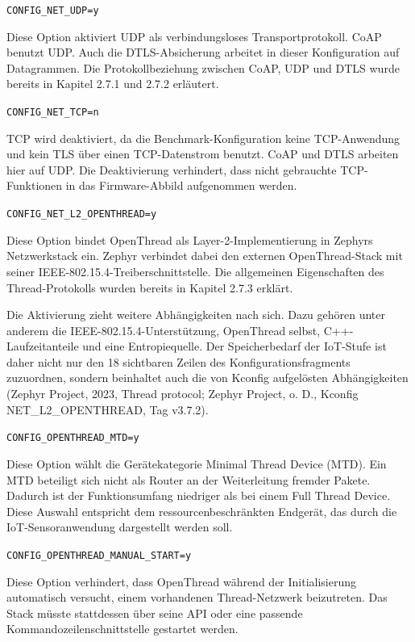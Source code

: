\lstinline[style=fileinline]|CONFIG_NET_UDP=y|

Diese Option aktiviert UDP als verbindungsloses Transportprotokoll. CoAP benutzt UDP. Auch die DTLS-Absicherung arbeitet in dieser Konfiguration auf Datagrammen. Die Protokollbeziehung zwischen CoAP, UDP und DTLS wurde bereits in Kapitel 2.7.1 und 2.7.2 erl{\"a}utert.

\lstinline[style=fileinline]|CONFIG_NET_TCP=n|

TCP wird deaktiviert, da die Benchmark-Konfiguration keine TCP-Anwendung und kein TLS {\"u}ber einen TCP-Datenstrom benutzt. CoAP und DTLS arbeiten hier auf UDP. Die Deaktivierung verhindert, dass nicht gebrauchte TCP-Funktionen in das Firmware-Abbild aufgenommen werden.

\lstinline[style=fileinline]|CONFIG_NET_L2_OPENTHREAD=y|

Diese Option bindet OpenThread als Layer-2-Implementierung in Zephyrs Netzwerkstack ein. Zephyr verbindet dabei den externen OpenThread-Stack mit seiner IEEE-802.15.4-Treiberschnittstelle. Die allgemeinen Eigenschaften des Thread-Protokolls wurden bereits in Kapitel 2.7.3 erkl{\"a}rt.

Die Aktivierung zieht weitere Abh{\"a}ngigkeiten nach sich. Dazu geh{\"o}ren unter anderem die IEEE-802.15.4-Unterst{\"u}tzung, OpenThread selbst, C++-Laufzeitanteile und eine Entropiequelle. Der Speicherbedarf der IoT-Stufe ist daher nicht nur den 18 sichtbaren Zeilen des Konfigurationsfragments zuzuordnen, sondern beinhaltet auch die von Kconfig aufgel{\"o}sten Abh{\"a}ngigkeiten (Zephyr Project, 2023, \glqq{}Thread protocol\grqq{}; Zephyr Project, o. D., Kconfig NET\_L2\_OPENTHREAD, Tag v3.7.2).

\lstinline[style=fileinline]|CONFIG_OPENTHREAD_MTD=y|

Diese Option w{\"a}hlt die Ger{\"a}tekategorie Minimal Thread Device (MTD). Ein MTD beteiligt sich nicht als Router an der Weiterleitung fremder Pakete. Dadurch ist der Funktionsumfang niedriger als bei einem Full Thread Device. Diese Auswahl entspricht dem ressourcenbeschr{\"a}nkten Endger{\"a}t, das durch die IoT-Sensoranwendung dargestellt werden soll.

\lstinline[style=fileinline]|CONFIG_OPENTHREAD_MANUAL_START=y|

Diese Option verhindert, dass OpenThread w{\"a}hrend der Initialisierung automatisch versucht, einem vorhandenen Thread-Netzwerk beizutreten. Das Stack m{\"u}sste stattdessen {\"u}ber seine API oder eine passende Kommandozeilenschnittstelle gestartet werden.

